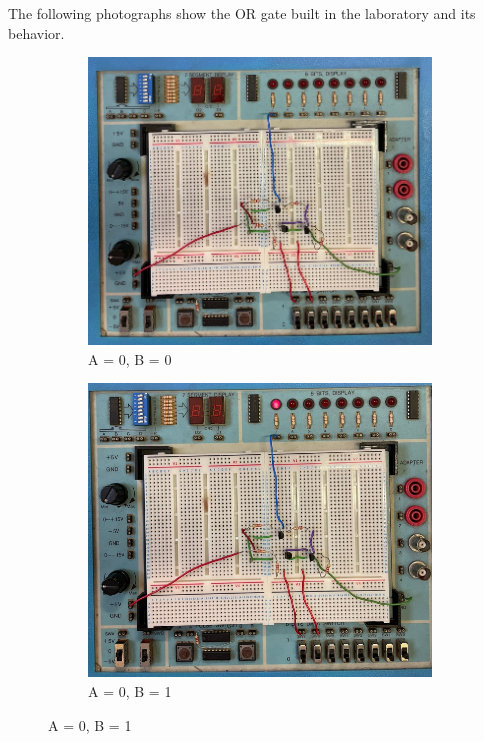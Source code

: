     \noindent
    The following photographs show the OR gate built in the laboratory and its behavior.
    \begin{figure}[H]
        \centering

        \begin{subfigure}{0.45\textwidth}
            \centering
            \includegraphics[width=\linewidth]{figures/photos/OR/00.png}
            \caption{A = 0, B = 0}
        \end{subfigure}
        \hfill
        \begin{subfigure}{0.45\textwidth}
            \centering
            \includegraphics[width=\linewidth]{figures/photos/OR/01.png}
            \caption{A = 0, B = 1}
        \end{subfigure}


\end{figure}
